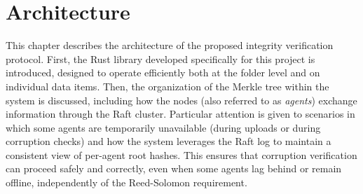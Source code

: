 \chapter{Architecture}

 This chapter describes the architecture of the proposed integrity verification
 protocol. First, the Rust library developed specifically for this project is
 introduced, designed to operate efficiently both at the folder level and on
 individual data items. Then, the organization of the Merkle tree within the
 system is discussed, including how the nodes (also referred to as
 \textit{agents}) exchange information through the Raft cluster. Particular attention is given to scenarios in which some agents are temporarily unavailable (during uploads or during corruption checks) and how the system leverages the Raft log to maintain a consistent view of per-agent root hashes. This ensures that corruption verification can proceed safely and correctly, even when some agents lag behind or remain offline, independently of the Reed-Solomon requirement.




